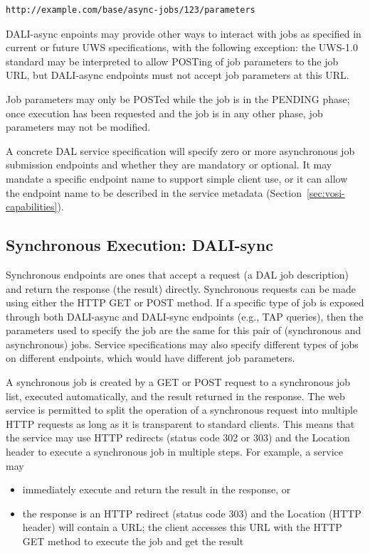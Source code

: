 \documentclass[11pt,letter]{ivoa}
\begin{document}
\begin{verbatim}
http://example.com/base/async-jobs/123/parameters
\end{verbatim}

DALI-async enpoints may provide other ways to interact with jobs as specified
in current or future UWS specifications, with the following exception: the
UWS-1.0 standard may be interpreted to allow POSTing of job parameters to the
job URL, but DALI-async endpoints must not accept job parameters at this URL.

Job parameters may only be POSTed while the job is in the PENDING phase; once
execution has been requested and the job is in any other phase, job parameters
may not be modified.

A concrete DAL service specification will specify zero or more asynchronous job
submission endpoints and whether they are mandatory or optional. It may mandate
a specific endpoint name to support simple client use, or it can allow the
endpoint name to be described in the service metadata (Section~\ref{sec:vosi-capabilities}).

\subsection{Synchronous Execution: DALI-sync}
\label{sec:dali-sync}
Synchronous endpoints are ones that accept a request (a DAL job
description) and return the response (the result) directly. Synchronous requests
can be made using either the HTTP GET or POST method. If a specific type of job
is exposed through both DALI-async and DALI-sync endpoints (e.g., TAP queries),
then the parameters used to specify the job are the same for  this pair of
(synchronous and asynchronous) jobs. Service specifications may also specify
different types of jobs on different endpoints, which would have different job
parameters.

A synchronous job is created by a GET or POST request to a synchronous job list,
executed automatically, and the result returned in the response. The web service
is permitted to split the operation of a synchronous request into multiple HTTP
requests as long as it is transparent to standard clients. This means that the
service may use HTTP redirects (status code 302 or 303) and the Location header
to execute a synchronous job in multiple steps. For example, a service may

\begin{itemize}
\item immediately execute and return the result in the response, or
\item the response is an HTTP redirect (status code 303) and the Location (HTTP
header) will contain a URL; the client accesses this URL with the HTTP GET
method to execute the job and get the result
\end{itemize}
\end{document}
